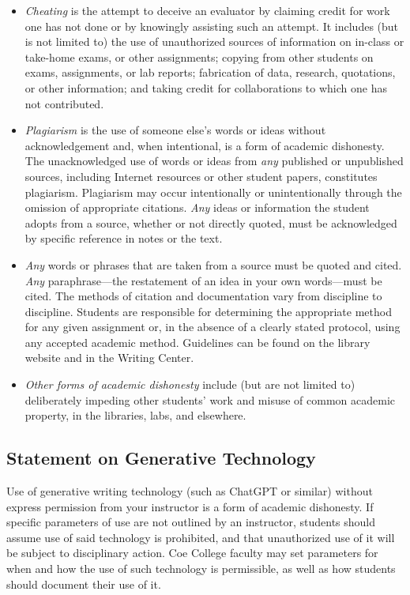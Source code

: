 \documentclass[
  letterpaper,
]{scrbook}
\providecommand{\tightlist}{%
  \setlength{\itemsep}{0pt}\setlength{\parskip}{0pt}}
\begin{document}
\begin{itemize}
\tightlist
\item
  \emph{Cheating} is the attempt to deceive an evaluator by claiming
  credit for work one has not done or by knowingly assisting such an
  attempt. It includes (but is not limited to) the use of unauthorized
  sources of information on in-class or take-home exams, or other
  assignments; copying from other students on exams, assignments, or lab
  reports; fabrication of data, research, quotations, or other
  information; and taking credit for collaborations to which one has not
  contributed.
\item
  \emph{Plagiarism} is the use of someone else's words or ideas without
  acknowledgement and, when intentional, is a form of academic
  dishonesty. The unacknowledged use of words or ideas from \emph{any}
  published or unpublished sources, including Internet resources or
  other student papers, constitutes plagiarism. Plagiarism may occur
  intentionally or unintentionally through the omission of appropriate
  citations. \emph{Any} ideas or information the student adopts from a
  source, whether or not directly quoted, must be acknowledged by
  specific reference in notes or the text.
\item
  \emph{Any} words or phrases that are taken from a source must be
  quoted and cited. \emph{Any} paraphrase---the restatement of an idea
  in your own words---must be cited. The methods of citation and
  documentation vary from discipline to discipline. Students are
  responsible for determining the appropriate method for any given
  assignment or, in the absence of a clearly stated protocol, using any
  accepted academic method. Guidelines can be found on the library
  website and in the Writing Center.
\item
  \emph{Other forms of academic dishonesty} include (but are not limited
  to) deliberately impeding other students' work and misuse of common
  academic property, in the libraries, labs, and elsewhere.
\end{itemize}

\subsection{Statement on Generative
Technology}\label{statement-on-generative-technology}

Use of generative writing technology (such as ChatGPT or similar)
without express permission from your instructor is a form of academic
dishonesty. If specific parameters of use are not outlined by an
instructor, students should assume use of said technology is prohibited,
and that unauthorized use of it will be subject to disciplinary action.
Coe College faculty may set parameters for when and how the use of such
technology is permissible, as well as how students should document their
use of it.
\end{document}
